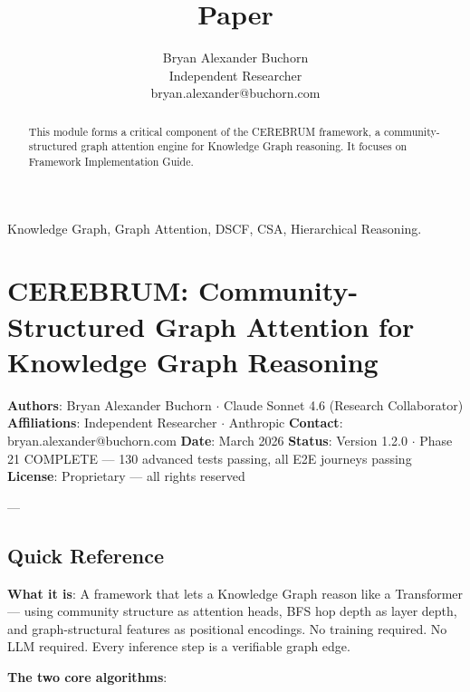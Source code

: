 \documentclass[10pt,journal,compsoc]{IEEEtran}
\begin{document}
\title{Paper}
\author{Bryan Alexander Buchorn \\ Independent Researcher \\ bryan.alexander@buchorn.com}

\maketitle

\begin{abstract}
This module forms a critical component of the CEREBRUM framework, a community-structured graph attention engine for Knowledge Graph reasoning. It focuses on Framework Implementation Guide.
\end{abstract}

\begin{IEEEkeywords}
Knowledge Graph, Graph Attention, DSCF, CSA, Hierarchical Reasoning.
\end{IEEEkeywords}

\section{CEREBRUM: Community-Structured Graph Attention for Knowledge Graph Reasoning}

\textbf{Authors}: Bryan Alexander Buchorn $\cdot$ Claude Sonnet 4.6 (Research Collab\-orator)
\textbf{Affili\-ations}: Independent Researcher $\cdot$ Anthropic
\textbf{Contact}: bryan.alexander@buchorn.com
\textbf{Date}: March 2026
\textbf{Status}: Version 1.2.0 $\cdot$ Phase 21 COMPLETE — 130 advanced tests passing, all E2E journeys passing
\textbf{License}: Proprietary — all rights reserved

---

\subsection{Quick Reference}

\textbf{What it is}: A framework that lets a Knowledge Graph reason like a Transformer —
using community structure as attention heads, BFS hop depth as layer depth, and
graph-structural features as positional encodings. No training required. No LLM required.
Every inference step is a verifiable graph edge.

\textbf{The two core algorithms}:
\end{document}
